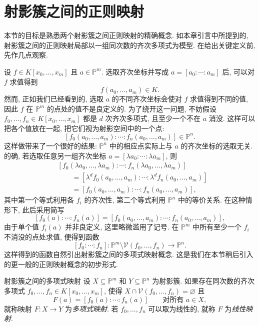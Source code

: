 \section{射影簇之间的正则映射}\label{sec:regular-maps-of-projective-varieties}

本节的目标是熟悉两个射影簇之间正则映射的精确概念. 如本章引言中所提到的, 射影簇之间的正则映射局部以一组同次数的齐次多项式为模型. 在给出关键定义前, 先作几点观察.

设 $f\in K[x_{0},\ldots,x_{m}]$ 且 $a\in\mathbb{P}^{m}$. 选取齐次坐标并写成 $a=[a_{0}:\cdots:a_{m}]$ 后, 可以对 $f$ 求值得到
\[
  f(a_{0},\ldots,a_{m})\in K.
\]
然而, 正如我们已经看到的, 选取 $a$ 的不同齐次坐标会使对 $f$ 求值得到不同的值, 因此 $f$ 在 $\mathbb{P}^{m}$ 的点处的值不是良定义的. 为了绕开这一问题, 不妨假设 $f_{0},\ldots,f_{n}\in K[x_{0},\ldots,x_{m}]$ 都是 $d$ 次齐次多项式, 且至少一个不在 $a$ 消没. 这样可以把各个值放在一起, 把它们视为射影空间中的一个点:
\[
  [f_{0}(a_{0},\ldots,a_{m}):\cdots:f_{n}(a_{0},\ldots,a_{m})]\in\mathbb{P}^{n}.
\]
这样做带来了一个很好的结果: $\mathbb{P}^{n}$ 中的相应点实际上与 $a$ 的齐次坐标的选取无关. 的确, 若选取任意另一组齐次坐标 $a=[\lambda a_{0}:\cdots:\lambda a_{m}]$, 则
\[
  \begin{aligned}
  &[f_{0}(\lambda a_{0},\ldots,\lambda a_{m}):\cdots:f_{n}(\lambda a_{0},\ldots,\lambda a_{m})]\\
  &\qquad=[\lambda^{d}f_{0}(a_{0},\ldots,a_{m}):\cdots:\lambda^{d}f_{n}(a_{0},\ldots,a_{m})]\\
  &\qquad=[f_{0}(a_{0},\ldots,a_{m}):\cdots:f_{n}(a_{0},\ldots,a_{m})],
  \end{aligned}
\]
其中第一个等式利用各 $f_{i}$ 的齐次性, 第二个等式利用 $\mathbb{P}^{n}$ 中的等价关系. 在这种情形下, 此后采用简写
\[
  [f_{0}(a):\cdots:f_{n}(a)]=[f_{0}(a_{0},\ldots,a_{m}):\cdots:f_{n}(a_{0},\ldots,a_{m})],
\]
由于单个值 $f_{i}(a)$ 并非良定义, 这里略微滥用了记号. 在 $\mathbb{P}^{m}$ 中所有至少一个 $f_{i}$ 不消没的点处求值, 便得到函数
\[
  [f_{0}:\cdots:f_{n}]:\mathbb{P}^{m}\setminus\mathcal{V}(f_{0},\ldots,f_{n})\to\mathbb{P}^{n}.
\]
这样得到的函数自然引出射影簇之间的多项式映射概念. 这是我们在本节稍后引入的更一般的正则映射概念的初步形式.

\begin{Definition}{射影簇之间的多项式映射}\leavevmode\label{def:polynomial-maps-between-projective-varieties}
设 $X\subseteq\mathbb{P}^{m}$ 和 $Y\subseteq\mathbb{P}^{n}$ 为射影簇. 如果存在同次数的齐次多项式 $f_{0},\ldots,f_{n}\in K[x_{0},\ldots,x_{m}]$, 使得 $X\cap\mathcal{V}(f_{0},\ldots,f_{n})=\varnothing$ 且
\[
  F(a)=[f_{0}(a):\cdots:f_{n}(a)]\qquad\text{对所有 }a\in X,
\]
就称映射 $F:X\to Y$ 为\emph{多项式映射}. 若 $f_{0},\ldots,f_{n}$ 可以取为线性的, 就称 $F$ 为\emph{线性映射}.
\end{Definition}

